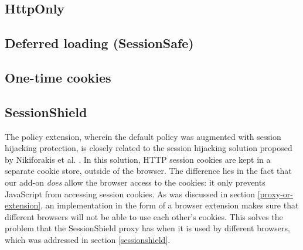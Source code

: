 
\subsection{HttpOnly}\label{httponlyremark}


\subsection{Deferred loading (SessionSafe)}


\subsection{One-time cookies}



\subsection{SessionShield}
The policy extension, wherein the default policy was augmented with session hijacking protection, is closely related to the session hijacking solution proposed by Nikiforakis et al. \cite{Nikiforakis2010}. In this solution, HTTP session cookies are kept in a separate cookie store, outside of the browser. The difference lies in the fact that our add-on \emph{does} allow the browser access to the cookies: it only prevents JavaScript from accessing session cookies. As was discussed in section \ref{proxy-or-extension}, an implementation in the form of a browser extension makes sure that different browsers will not be able to use each other's cookies. This solves the problem that the SessionShield proxy has when it is used by different browsers, which was addressed in section \ref{sessionshield}.
